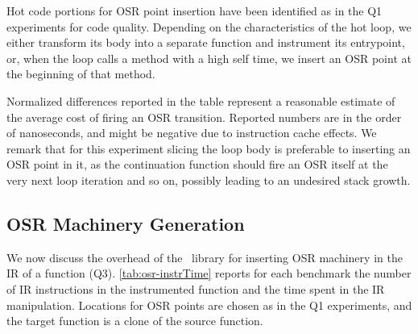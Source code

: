 Hot code portions for OSR point insertion have been identified as in the Q1 experiments for code quality. Depending on the characteristics of the hot loop, we either transform its body into a separate function and instrument its entrypoint, or, when the loop calls a method with a high self time, we insert an OSR point at the beginning of that method.

Normalized differences reported in the table represent a reasonable estimate of the average cost of firing an OSR transition.
Reported numbers are in the order of nanoseconds, and might be negative due to instruction cache effects. We remark that for this experiment slicing the loop body is preferable to inserting an OSR point in it, as the continuation function should fire an OSR itself at the very next loop iteration and so on, possibly leading to an undesired stack growth.

\subsection{OSR Machinery Generation}

We now discuss the overhead of the \osrkit\ library for inserting OSR machinery in the IR of a function (Q3). \mytable\ref{tab:osr-instrTime} reports for each benchmark the number of IR instructions in the instrumented function and the time spent in the IR manipulation. Locations for OSR points are chosen as in the Q1 experiments, and the target function is a clone of the source function.

